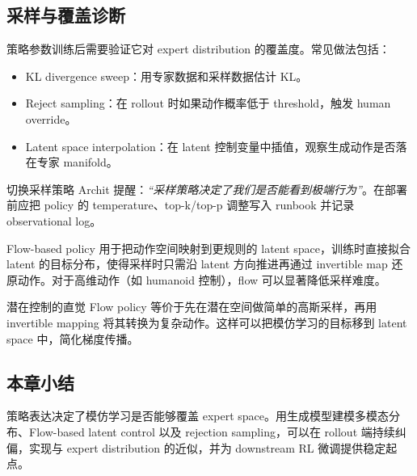 \subsection{采样与覆盖诊断}

策略参数训练后需要验证它对 expert distribution 的覆盖度。常见做法包括：
\begin{itemize}
    \item KL divergence sweep：用专家数据和采样数据估计 KL。
    \item Reject sampling：在 rollout 时如果动作概率低于 threshold，触发 human override。
    \item Latent space interpolation：在 latent 控制变量中插值，观察生成动作是否落在专家 manifold。
\end{itemize}

\begin{knowledgebox}{切换采样策略}
Archit 提醒：\textit{``采样策略决定了我们是否能看到极端行为''}。在部署前应把 policy 的 temperature、top-k/top-p 调整写入 runbook 并记录 observational log。
\end{knowledgebox}

Flow-based policy 用于把动作空间映射到更规则的 latent space，训练时直接拟合 latent 的目标分布，使得采样时只需沿 latent 方向推进再通过 invertible map 还原动作。对于高维动作（如 humanoid 控制），flow 可以显著降低采样难度。

\begin{importantbox}{潜在控制的直觉}
Flow policy 等价于先在潜在空间做简单的高斯采样，再用 invertible mapping 将其转换为复杂动作。这样可以把模仿学习的目标移到 latent space 中，简化梯度传播。
\end{importantbox}

\subsection{本章小结}

策略表达决定了模仿学习是否能够覆盖 expert space。用生成模型建模多模态分布、Flow-based latent control 以及 rejection sampling，可以在 rollout 端持续纠偏，实现与 expert distribution 的近似，并为 downstream RL 微调提供稳定起点。

